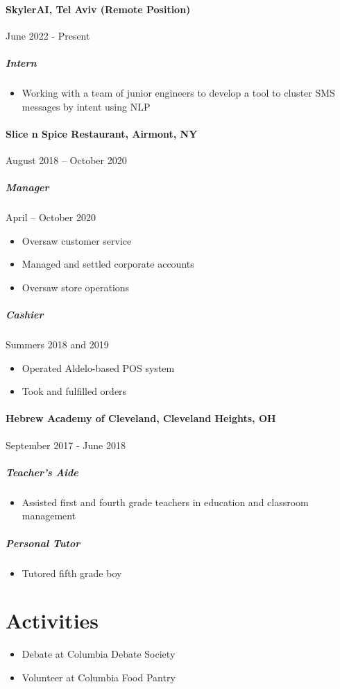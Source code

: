 \documentclass[10pt]{article}
\begin{document}
    \paragraph{SkylerAI, Tel Aviv (Remote Position)} \hfill June 2022 - Present
    \subparagraph*{Intern}
    \begin{itemize}
        \item Working with a team of junior engineers to develop a tool to cluster SMS messages by intent using NLP
    \end{itemize}

    \paragraph*{Slice n Spice Restaurant, Airmont, NY} \hfill August 2018 – October 2020
    \subparagraph*{Manager} \hfill April – October 2020
    \begin{itemize}
        \item Oversaw customer service
        \item Managed and settled corporate accounts
        \item Oversaw store operations
    \end{itemize}
    \subparagraph*{Cashier} \hfill Summers 2018 and 2019
    \begin{itemize}
        \item Operated Aldelo-based POS system
        \item Took and fulfilled orders
    \end{itemize}

    \paragraph*{Hebrew Academy of Cleveland, Cleveland Heights, OH} \hfill  September 2017 - June 2018
    \subparagraph*{Teacher's Aide}
    \begin{itemize}
        \item  Assisted first and fourth grade teachers in education and classroom management
    \end{itemize}
    \subparagraph*{Personal Tutor}
    \begin{itemize}
        \item Tutored fifth grade boy
    \end{itemize}


\section*{Activities}
    \begin{itemize}
        \item Debate at Columbia Debate Society
        \item Volunteer at Columbia Food Pantry
    \end{itemize}
\end{document}
